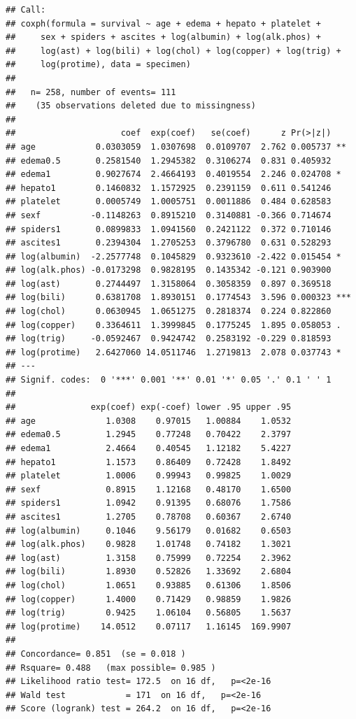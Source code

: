\documentclass[]{article}
\begin{document}
\begin{verbatim}
## Call:
## coxph(formula = survival ~ age + edema + hepato + platelet + 
##     sex + spiders + ascites + log(albumin) + log(alk.phos) + 
##     log(ast) + log(bili) + log(chol) + log(copper) + log(trig) + 
##     log(protime), data = specimen)
## 
##   n= 258, number of events= 111 
##    (35 observations deleted due to missingness)
## 
##                     coef  exp(coef)   se(coef)      z Pr(>|z|)    
## age            0.0303059  1.0307698  0.0109707  2.762 0.005737 ** 
## edema0.5       0.2581540  1.2945382  0.3106274  0.831 0.405932    
## edema1         0.9027674  2.4664193  0.4019554  2.246 0.024708 *  
## hepato1        0.1460832  1.1572925  0.2391159  0.611 0.541246    
## platelet       0.0005749  1.0005751  0.0011886  0.484 0.628583    
## sexf          -0.1148263  0.8915210  0.3140881 -0.366 0.714674    
## spiders1       0.0899833  1.0941560  0.2421122  0.372 0.710146    
## ascites1       0.2394304  1.2705253  0.3796780  0.631 0.528293    
## log(albumin)  -2.2577748  0.1045829  0.9323610 -2.422 0.015454 *  
## log(alk.phos) -0.0173298  0.9828195  0.1435342 -0.121 0.903900    
## log(ast)       0.2744497  1.3158064  0.3058359  0.897 0.369518    
## log(bili)      0.6381708  1.8930151  0.1774543  3.596 0.000323 ***
## log(chol)      0.0630945  1.0651275  0.2818374  0.224 0.822860    
## log(copper)    0.3364611  1.3999845  0.1775245  1.895 0.058053 .  
## log(trig)     -0.0592467  0.9424742  0.2583192 -0.229 0.818593    
## log(protime)   2.6427060 14.0511746  1.2719813  2.078 0.037743 *  
## ---
## Signif. codes:  0 '***' 0.001 '**' 0.01 '*' 0.05 '.' 0.1 ' ' 1
## 
##               exp(coef) exp(-coef) lower .95 upper .95
## age              1.0308    0.97015   1.00884    1.0532
## edema0.5         1.2945    0.77248   0.70422    2.3797
## edema1           2.4664    0.40545   1.12182    5.4227
## hepato1          1.1573    0.86409   0.72428    1.8492
## platelet         1.0006    0.99943   0.99825    1.0029
## sexf             0.8915    1.12168   0.48170    1.6500
## spiders1         1.0942    0.91395   0.68076    1.7586
## ascites1         1.2705    0.78708   0.60367    2.6740
## log(albumin)     0.1046    9.56179   0.01682    0.6503
## log(alk.phos)    0.9828    1.01748   0.74182    1.3021
## log(ast)         1.3158    0.75999   0.72254    2.3962
## log(bili)        1.8930    0.52826   1.33692    2.6804
## log(chol)        1.0651    0.93885   0.61306    1.8506
## log(copper)      1.4000    0.71429   0.98859    1.9826
## log(trig)        0.9425    1.06104   0.56805    1.5637
## log(protime)    14.0512    0.07117   1.16145  169.9907
## 
## Concordance= 0.851  (se = 0.018 )
## Rsquare= 0.488   (max possible= 0.985 )
## Likelihood ratio test= 172.5  on 16 df,   p=<2e-16
## Wald test            = 171  on 16 df,   p=<2e-16
## Score (logrank) test = 264.2  on 16 df,   p=<2e-16
\end{verbatim}
\end{document}
